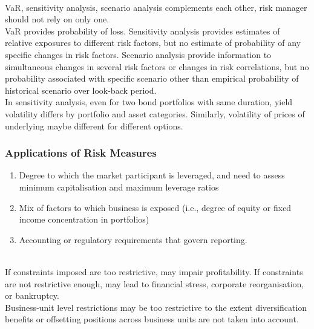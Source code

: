 \begin{remark} \\
VaR, sensitivity analysis, scenario analysis complements each other, risk manager should not rely on only one.\\
VaR provides probability of loss. Sensitivity analysis provides estimates of relative exposures to different risk factors, but no estimate of probability of any specific changes in risk factors. Scenario analysis provide information to simultaneous changes in several risk factors or changes in risk correlations, but no probability associated with specific scenario other than empirical probability of historical scenario over look-back period.\\
In sensitivity analysis, even for two bond portfolios with same duration, yield volatility differs by portfolio and asset categories. Similarly, volatility of prices of underlying maybe different for different options.
\end{remark}

\subsubsection{Applications of Risk Measures}

\begin{remark} 
\begin{enumerate}[label=\roman*.]
\setlength{\itemsep}{0pt}
\item Degree to which the market participant is leveraged, and need to assess minimum capitalisation and maximum leverage ratios
\item Mix of factors to which business is exposed (i.e., degree of equity or fixed income concentration in portfolios)
\item Accounting or regulatory requirements that govern reporting.
\end{enumerate}
\end{remark}

\begin{remark} \\
If constraints imposed are too restrictive, may impair profitability. If constraints are not restrictive enough, may lead to financial stress, corporate reorganisation, or bankruptcy.\\
Business-unit level restrictions may be too restrictive to the extent diversification benefits or offsetting positions across business units are not taken into account.
\end{remark}

